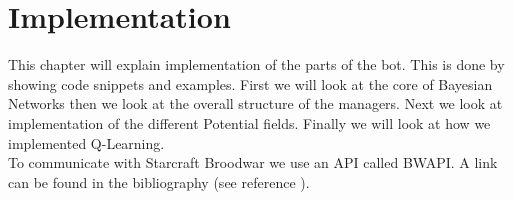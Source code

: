 \chapter{Implementation}
This chapter will explain implementation of the parts of the bot. This is done by showing code snippets and examples. First we will look at the core of Bayesian Networks then we look at the overall structure of the managers. Next we look at implementation of the different Potential fields. Finally we will look at how we implemented Q-Learning.\\

To communicate with Starcraft Broodwar we use an API called BWAPI. A link can be found in the bibliography (see reference \cite{bwapi}).


	
	
	
	